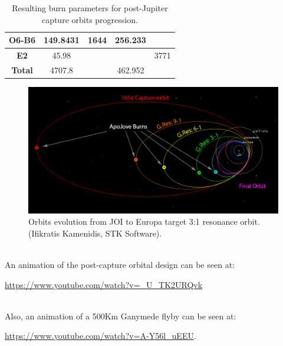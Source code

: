 \begin{table}[htb!]
\begin{tabular}{|r|r|r|r|r|}
    \hline
    \multicolumn{1}{|c|}{\textbf{O6-B6}} & \multicolumn{1}{c|}{149.8431} & \multicolumn{1}{c|}{1644} & \multicolumn{1}{c|}{256.233} & \multicolumn{1}{c|}{} \bigstrut\\
    \hline
    \multicolumn{1}{|c|}{\textbf{E2}} & \multicolumn{1}{c|}{45.98} &       & \multicolumn{1}{c|}{} & \multicolumn{1}{c|}{3771} \bigstrut\\
    \hline
    \multicolumn{1}{|c|}{\textbf{Total }} & \multicolumn{1}{c|}{4707.8} &       & \multicolumn{1}{c|}{462.952} & \multicolumn{1}{c|}{} \bigstrut\\
    \hline
    \end{tabular}%
    \caption{Resulting burn parameters for post-Jupiter capture orbits progression.}
  \label{tab:boardm}%
\end{table}%

\begin{figure}[htb!]
\centering
\includegraphics[width=\textwidth]{figures/Orbiter/orbits.png}
\caption{Orbits evolution from JOI to Europa target 3:1 resonance orbit. (Ifikratis Kamenidis, STK Software).}\label{fig:orbits_resonance}
\end{figure}
\begin{description}[align=left]
\item [Post-capture orbital design]\hfill \\
An animation of the post-capture orbital design can be seen at:

\url{https://www.youtube.com/watch?v=_U_TK2URQvk}
\item [Ganymede Flyby]\hfill \\
Also, an animation of a 500Km Ganymede flyby can be seen at:

\url{https://www.youtube.com/watch?v=A-Y56l_uEEU}.
\end{description}
